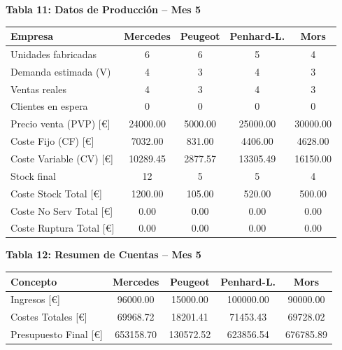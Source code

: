 \documentclass{standalone}
\begin{document}
	\vspace{4em} %
	
	\begin{minipage}{1.08\linewidth}
		\centering
		
		\textbf{Tabla 11: Datos de Producción – Mes 5}\\[0.5em]
		\begin{tabular}{@{}l
				S[table-format=2.0]
				S[table-format=2.0]
				S[table-format=2.0]
				S[table-format=2.0]@{}}
			\toprule
			\textbf{Empresa} & \textbf{Mercedes} & \textbf{Peugeot} & \textbf{Penhard-L.} & \textbf{Mors} \\
			\midrule
			Unidades fabricadas & 6 & 6 & 5 & 4 \\
			Demanda estimada (V) & 4 & 3 & 4 & 3 \\
			Ventas reales & 4 & 3 & 4 & 3 \\
			Clientes en espera & 0 & 0 & 0 & 0 \\
			Precio venta (PVP) [\euro] & 24000.00 & 5000.00 & 25000.00 & 30000.00 \\
			Coste Fijo (CF) [\euro] & 7032.00 & 831.00 & 4406.00 & 4628.00 \\
			Coste Variable (CV) [\euro] & 10289.45 & 2877.57 & 13305.49 & 16150.00 \\
			Stock final & 12 & 5 & 5 & 4 \\
			Coste Stock Total [\euro] & 1200.00 & 105.00 & 520.00 & 500.00 \\
			Coste No Serv Total [\euro] & 0.00 & 0.00 & 0.00 & 0.00 \\
			Coste Ruptura Total [\euro] & 0.00 & 0.00 & 0.00 & 0.00 \\
			\bottomrule
		\end{tabular}
		
		\vspace{2em} %
		
		\textbf{Tabla 12: Resumen de Cuentas – Mes 5}\\[0.5em]
		\begin{tabular}{@{}l
				S[table-format=7.2]
				S[table-format=7.2]
				S[table-format=7.2]
				S[table-format=7.2]@{}}
			\toprule
			\textbf{Concepto} & \textbf{Mercedes} & \textbf{Peugeot} & \textbf{Penhard-L.} & \textbf{Mors} \\
			\midrule
			Ingresos [\euro] & 96000.00 & 15000.00 & 100000.00 & 90000.00 \\
			Costes Totales [\euro] & 69968.72 & 18201.41 & 71453.43 & 69728.02 \\
			Presupuesto Final [\euro] & 653158.70 & 130572.52 & 623856.54 & 676785.89 \\
			\bottomrule
		\end{tabular}
		
	\end{minipage}
	
\end{document}
